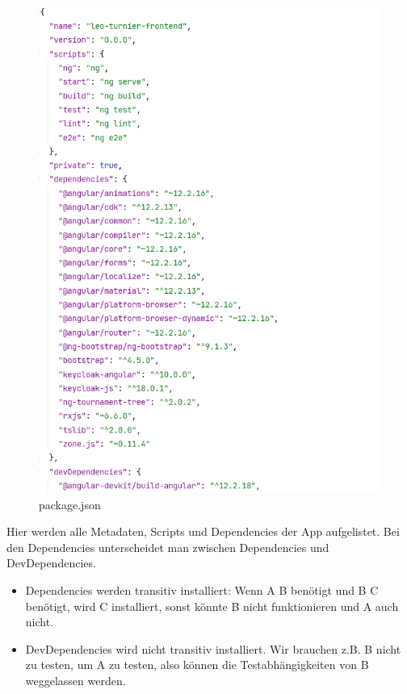 \begin{figure}[H]
    \includegraphics[scale=0.6]{pics/frontend/package_json.PNG}
    \caption{package.json}
\end{figure}

Hier werden alle Metadaten, Scripts und Dependencies der App aufgelistet.
Bei den Dependencies unterscheidet man zwischen Dependencies und DevDependencies.
\begin{itemize}
    \item Dependencies werden transitiv installiert: Wenn A B benötigt und B C benötigt, wird C installiert, sonst könnte B nicht funktionieren und A auch nicht.
    \item DevDependencies wird nicht transitiv installiert. Wir brauchen z.B. B nicht zu testen, um A zu testen, also können die Testabhängigkeiten von B weggelassen werden.
\end{itemize}

